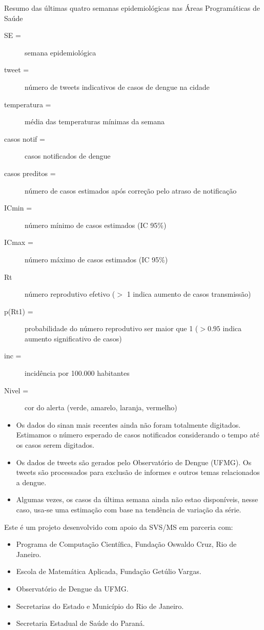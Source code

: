 \documentclass[10pt]{article} %
\begin{document}
\begin{center}
\begin{center}{Resumo das últimas quatro semanas epidemiológicas
nas Áreas Programáticas de Saúde}
\begin{minipage}[t]{1\linewidth}
  \begin{description}
  \item [SE =] semana epidemiológica
  \item [tweet =] número de tweets indicativos de casos de dengue na cidade
  \item [temperatura =] média das temperaturas mínimas da semana
  \item [casos notif =] casos notificados de dengue 
  \item [casos preditos =] número de casos estimados após correção pelo atraso de notificação
  \item [ICmin =] número mínimo de casos estimados (IC 95\%)
  \item [ICmax =] número máximo de casos estimados (IC 95\%)
  \item [Rt] número reprodutivo efetivo ($>$ 1 indica aumento de casos transmissão)
  \item [p(Rt1) =] probabilidade do número reprodutivo ser maior que 1 ($>0.95$ indica aumento significativo de casos)
  \item [inc =] incidência por 100.000 habitantes
  \item [Nivel =] cor do alerta (verde, amarelo, laranja, vermelho)
  \end{description}
  
  \hypertarget{notas}{}
  
  \begin{itemize}
  \item Os dados do sinan mais recentes ainda não foram totalmente digitados. Estimamos o número esperado de casos notificados considerando o tempo até os casos serem digitados.
  \item Os dados de tweets são gerados pelo Observatório de Dengue (UFMG). Os tweets são processados para exclusão de informes e outros temas relacionados a dengue.
  \item Algumas vezes, os casos da última semana ainda não estao disponíveis, nesse caso, usa-se uma estimação com base na tendência de variação da série.
  \end{itemize}
  
  \hypertarget{creditos}{}
  
  Este é um projeto desenvolvido com apoio da SVS/MS em parceria com:
    
    \begin{itemize}
  \item Programa de Computação Científica, Fundação Oswaldo Cruz, Rio de Janeiro.
  \item Escola de Matemática Aplicada, Fundação Getúlio Vargas.
  \item Observatório de Dengue da UFMG.
  \item Secretarias do Estado e Município do Rio de Janeiro.
  \item Secretaria Estadual de Saúde do Paraná.
  \end{itemize}
  

\end{minipage}
\end{center}
\end{center}
\end{document}
